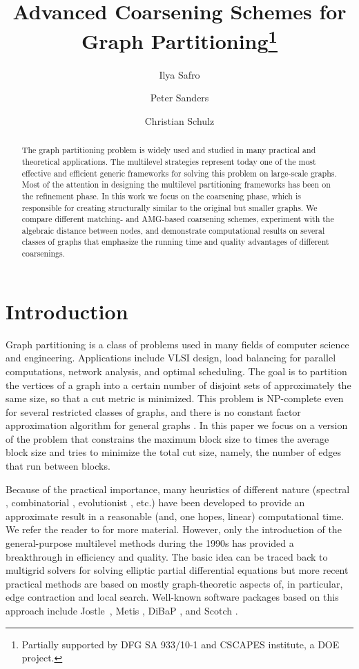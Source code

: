 \documentclass{llncs}
\title{\Large Advanced Coarsening Schemes for Graph Partitioning\thanks{Partially supported by DFG SA 933/10-1 and CSCAPES institute, a DOE project.}}
\author{
Ilya Safro\inst{1}
\and Peter Sanders\inst{2}
\and Christian Schulz \inst{2}
}
\institute{ Mathematics and Computer Science Division, Argonne National Laboratory\\ \email{safro@mcs.anl.gov}
\and Karlsruhe Institute of Technology, Institute for Theoretical Informatics, Algorithmics II\\
\email{sanders@kit.edu,  christian.schulz@kit.edu} 
}
\date{}
\begin{document}
\maketitle
\begin{abstract}
The graph partitioning problem is widely used and studied in many practical and theoretical applications. 
The multilevel strategies represent today one of the most effective and efficient generic frameworks for solving this problem on large-scale graphs. 
Most of the attention in designing the multilevel partitioning frameworks has been on the refinement  phase. 
In this work we focus on the coarsening phase, which is responsible for creating structurally 
similar to the original but smaller graphs. 
We compare different matching- and AMG-based coarsening schemes, experiment with the algebraic distance between nodes, and demonstrate computational results on several classes of graphs that emphasize the running time and quality advantages of different coarsenings.
\end{abstract}
\section{Introduction}
\thispagestyle{empty}
Graph partitioning is a class of problems used in many fields of computer
science and engineering. Applications include VLSI design, load balancing for parallel computations,  network analysis, and optimal scheduling. The goal is to partition the vertices of a graph into a certain number of disjoint sets
of approximately the same size, so that a cut metric is minimized.
This problem is NP-complete even for several restricted classes of graphs, and there is no constant factor approximation algorithm for general graphs \cite{journals/ipl/BuiJ92}. 
In this paper we focus on a version of the problem that constrains the
maximum block size to  times the average block size and tries to
minimize the total cut size, namely, the number of edges that run between blocks.


Because of the  practical importance, many heuristics of different nature (spectral \cite{pothen-part}, combinatorial \cite{fiduccia1982lth}, evolutionist \cite{buiMoon96,kaffpaE}, etc.) have
been developed to provide an approximate result in a reasonable (and, one hopes,
linear) computational time. We refer the reader to  \cite{fjallstrom1998agp,SchKarKum00,Walshaw07} for more material.
However, only the introduction of the general-purpose multilevel methods during the 1990s has provided a breakthrough in efficiency and quality. 
The basic idea can be traced back to multigrid solvers for solving elliptic partial differential equations \cite{mgbooktrott} but more recent practical methods are based on mostly graph-theoretic aspects of, in particular, edge contraction and local search.  Well-known software packages based on this approach include Jostle~\cite{Walshaw07}, Metis \cite{SchKarKum00}, DiBaP \cite{meyerhenke2008ndb}, and Scotch \cite{Scotch}.  
\end{document}
